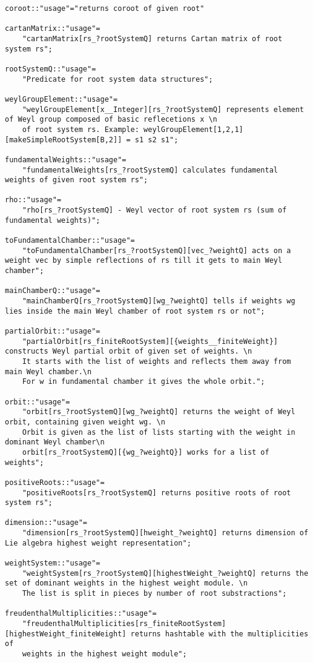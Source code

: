 \documentclass[preprint,12pt]{article}
\begin{document}
\begin{lstlisting}
coroot::"usage"="returns coroot of given root"

cartanMatrix::"usage"=
    "cartanMatrix[rs_?rootSystemQ] returns Cartan matrix of root system rs";

rootSystemQ::"usage"=
    "Predicate for root system data structures";

weylGroupElement::"usage"=
    "weylGroupElement[x__Integer][rs_?rootSystemQ] represents element of Weyl group composed of basic reflecetions x \n
    of root system rs. Example: weylGroupElement[1,2,1][makeSimpleRootSystem[B,2]] = s1 s2 s1";

fundamentalWeights::"usage"=
    "fundamentalWeights[rs_?rootSystemQ] calculates fundamental weights of given root system rs";

rho::"usage"=
    "rho[rs_?rootSystemQ] - Weyl vector of root system rs (sum of fundamental weights)";

toFundamentalChamber::"usage"=
    "toFundamentalChamber[rs_?rootSystemQ][vec_?weightQ] acts on a weight vec by simple reflections of rs till it gets to main Weyl chamber";

mainChamberQ::"usage"=
    "mainChamberQ[rs_?rootSystemQ][wg_?weightQ] tells if weights wg lies inside the main Weyl chamber of root system rs or not";

partialOrbit::"usage"=
    "partialOrbit[rs_finiteRootSystem][{weights__finiteWeight}] constructs Weyl partial orbit of given set of weights. \n
    It starts with the list of weights and reflects them away from main Weyl chamber.\n
    For w in fundamental chamber it gives the whole orbit.";

orbit::"usage"=
    "orbit[rs_?rootSystemQ][wg_?weightQ] returns the weight of Weyl orbit, containing given weight wg. \n
    Orbit is given as the list of lists starting with the weight in dominant Weyl chamber\n
    orbit[rs_?rootSystemQ][{wg_?weightQ}] works for a list of weights";

positiveRoots::"usage"=
    "positiveRoots[rs_?rootSystemQ] returns positive roots of root system rs";

dimension::"usage"=
    "dimension[rs_?rootSystemQ][hweight_?weightQ] returns dimension of Lie algebra highest weight representation";

weightSystem::"usage"=
    "weightSystem[rs_?rootSystemQ][highestWeight_?weightQ] returns the set of dominant weights in the highest weight module. \n
    The list is split in pieces by number of root substractions";

freudenthalMultiplicities::"usage"=
    "freudenthalMultiplicities[rs_finiteRootSystem][highestWeight_finiteWeight] returns hashtable with the multiplicities of 
    weights in the highest weight module";


\end{lstlisting}
\end{document}
